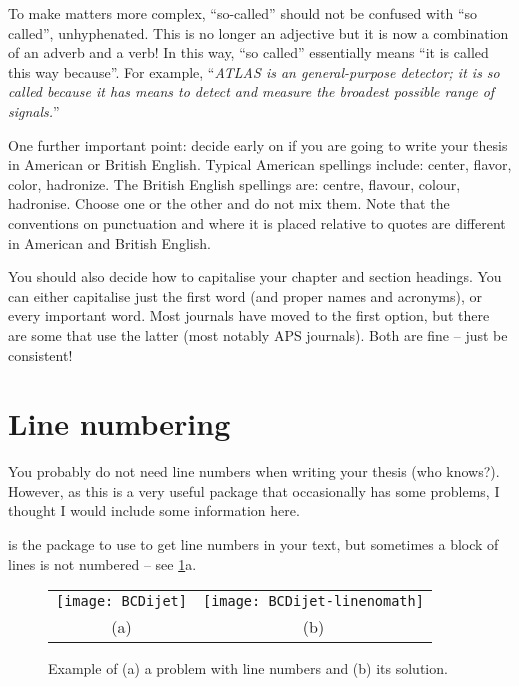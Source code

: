 To  make matters more complex, \enquote{so-called} should not be confused with \enquote{so called}, unhyphenated.
This is no longer an adjective but it is now a combination of an adverb and a verb!
In this way, \enquote{so called} essentially means \enquote{it is called this way because}.
For example, \enquote{\emph{ATLAS is an general-purpose detector;
  it is so called because it has means to detect and measure the broadest possible range of signals.}}

One further important point: decide early on if you are going to write your thesis in American or British English.
Typical American spellings include: \foreignlanguage{USenglish}{center, flavor, color, hadronize}.
The British English spellings are: centre, flavour, colour, hadronise.
Choose one or the other and do not mix them.
Note that the conventions on punctuation and where it is placed relative to quotes
are different in American and British English.

You should also decide how to capitalise your chapter and section headings.
You can either capitalise just the first word (and proper names and acronyms),
or every important word.
Most journals have moved to the first option,
but there are some that use the latter (most notably APS journals).
Both are fine -- just be consistent!

\section{Line numbering}%
\label{sec:tips:lineno}

You probably do not need line numbers when writing your
thesis (who knows?). However, as this is a very useful package that
occasionally has some problems, I thought I would include some
information here.

 is the package to use to get line numbers in your text,
but sometimes a block of lines is not numbered -- see \cref{fig:lineno}a.

\begin{figure}[htbp]
  \centering
  \begin{tabular}{cc}
  \texttt{[image: BCDijet]} &
  \texttt{[image: BCDijet-linenomath]}\\
  (a) & (b)
  \end{tabular}
  \caption{Example of (a) a problem with line numbers and (b) its solution.}%
  \label{fig:lineno}
\end{figure}

